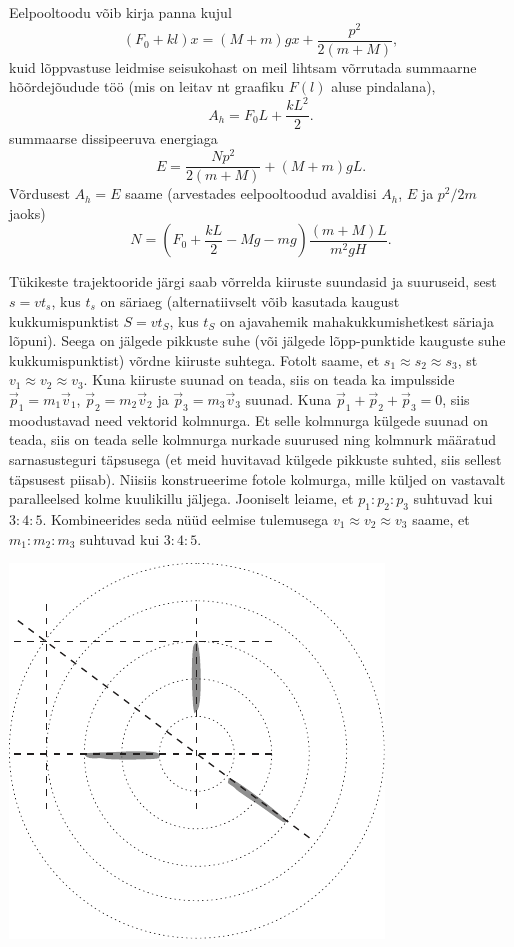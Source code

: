 \documentclass[10pt]{article}
\begin{document}
{Eelpooltoodu võib kirja panna kujul
\[
(F_0 + kl)x = (M + m) gx + \frac{p^2}{2(m+M)},
\]
kuid lõppvastuse leidmise seisukohast on meil lihtsam võrrutada summaarne hõõrdejõudude töö (mis on leitav nt graafiku $F(l)$ aluse pindalana),
\[
A_h = F_0L + \frac{kL^2}{2}.
\]
summaarse dissipeeruva energiaga
\[
E=\frac{N p^{2}}{2(m+M)}+(M+m) g L.
\]
Võrdusest $A_h = E$ saame (arvestades eelpooltoodud avaldisi $A_h$, $E$ ja $p^2/2m$ jaoks)
\[
N=\left(F_{0}+\frac{k L}{2}-M g-m g\right) \frac{(m+M) L}{m^{2} g H}.
\]
\probend
\bigskip


\solu
Tükikeste trajektooride järgi saab võrrelda kiiruste suundasid ja suuruseid, sest $s = vt_s$, kus $t_s$ on säriaeg (alternatiivselt võib kasutada kaugust kukkumispunktist $S = vt_S$, kus $t_S$ on ajavahemik mahakukkumishetkest säriaja lõpuni). Seega on jälgede pikkuste suhe (või jälgede lõpp-punktide kauguste suhe kukkumispunktist) võrdne kiiruste suhtega. Fotolt saame, et $s_1 \approx s_2 \approx s_3$, st $v_1 \approx v_2 \approx v_3$. Kuna kiiruste suunad on teada, siis on teada ka impulsside $\vec p_1 = m_1\vec v_1$, $\vec p_2 = m_2\vec v_2$ ja $\vec p_3 = m_3\vec v_3$ suunad. Kuna $\vec p_1 + \vec p_2 + \vec p_3 = 0$, siis moodustavad need vektorid kolmnurga. Et selle kolmnurga külgede suunad on teada, siis on teada selle kolmnurga nurkade suurused ning kolmnurk määratud sarnasusteguri täpsusega (et meid huvitavad külgede pikkuste suhted, siis sellest täpsusest piisab). Niisiis konstrueerime fotole kolmurga, mille küljed on vastavalt paralleelsed kolme kuulikillu jäljega. Jooniselt leiame, et $p_1 : p_2 : p_3$ suhtuvad kui $3 : 4 : 5$. Kombineerides seda nüüd eelmise tulemusega $v_1 \approx v_2 \approx v_3$ saame, et $m_1 : m_2 : m_3$ suhtuvad kui $3 : 4 : 5$.
\begin{center}
	\includegraphics[width=0.6\linewidth]{2008-v2g-06-lah}
\end{center}
\probend
\bigskip

}
\end{document}
